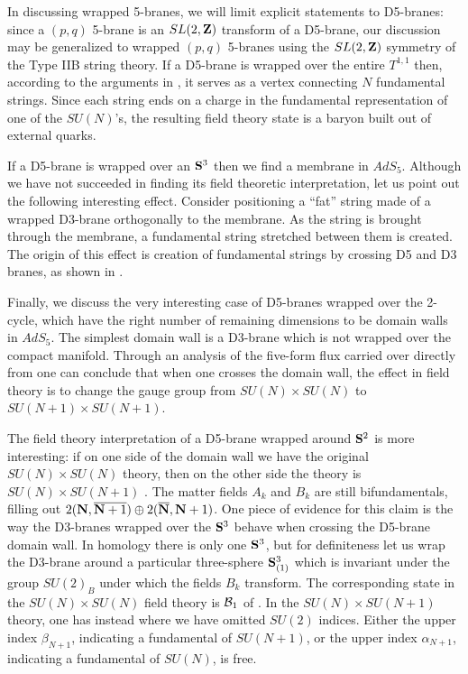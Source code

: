 \documentclass[12pt]{article}
\begin{document}
In discussing wrapped 5-branes, we will limit explicit statements
to D5-branes: since a $(p,q)$ 5-brane is an $SL(2,{\bf Z})$
transform of a D5-brane, our discussion may be 
generalized to wrapped $(p,q)$ 5-branes using the $SL(2,{\bf Z})$
symmetry of the Type IIB string theory.
If a D5-brane is wrapped over the entire $T^{1,1}$ then, according to
the arguments in \cite{Ed,GO}, it serves as a vertex connecting $N$
fundamental strings. Since each string ends on a charge in the
fundamental representation of one of the $SU(N)$'s, the resulting
field theory state is a baryon built out of external quarks.

If a
D5-brane is wrapped over an ${\bf S}^3$ then we find a membrane in
$AdS_5$. Although we have not succeeded in finding its field theoretic
interpretation, let us point out the following interesting effect.
Consider positioning a ``fat'' string made of a wrapped D3-brane
orthogonally to the membrane. As the string is brought through the
membrane, a fundamental string 
stretched between them 
is created. The origin of this effect
is creation of fundamental strings by crossing D5
and D3 branes, as shown in \cite{bdg,dfk}.

Finally, we discuss the very interesting case of D5-branes wrapped
over the 2-cycle, which have the right number of remaining dimensions
to be domain walls in $AdS_5$. The simplest domain wall is 
a D3-brane which is not wrapped over the compact manifold.
Through an analysis of the five-form flux carried over
directly from \cite{Ed} one can conclude that when one crosses the
domain wall, the effect in field theory is to change the gauge group
from $SU(N) \times SU(N)$ to $SU(N+1) \times SU(N+1)$.

The field theory interpretation of a D5-brane wrapped around ${\bf S}^2$ is
more interesting:  
if
on one side of the domain wall we have the original $SU(N) \times
SU(N)$ theory, then on the other side the theory is
$SU(N) \times SU(N+1)$ \cite{GK}.  
The matter fields $A_k$ and $B_k$ are still
bifundamentals, filling out $2 ({\bf N},\overline{{\bf N}+1}) \oplus 2
(\overline{{\bf N}}, {\bf N}+1)$.  
One piece of evidence for this claim
is the way the D3-branes wrapped over the ${\bf S}^3$
behave when crossing the D5-brane domain wall.
In homology there is only one ${\bf S}^3$, but for
definiteness let us wrap the D3-brane around a particular three-sphere
${\bf S}^3_{(1)}$ which is invariant under the group $SU(2)_B$ under which
the fields $B_k$ transform.  The corresponding state in the $SU(N)
\times SU(N)$ field theory is ${\cal B}_1$ of .  In the
$SU(N) \times SU(N+1)$ theory, one has instead
 where we have omitted $SU(2)$ indices.  Either the upper index
$\beta_{N+1}$, indicating a fundamental of $SU(N+1)$, or the upper
index $\alpha_{N+1}$, indicating a fundamental of $SU(N)$, is free.
\end{document}
